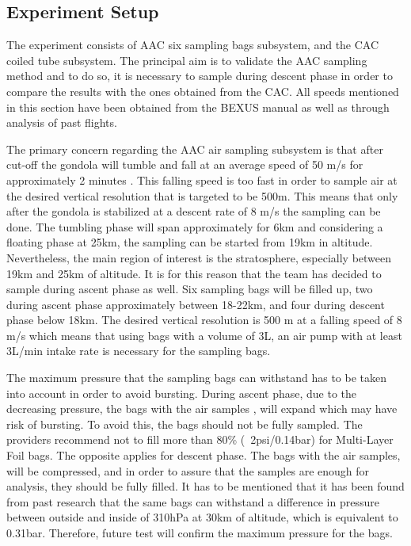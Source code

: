 \subsection{Experiment Setup} \label{Experiment_Setup}

The experiment consists of AAC six sampling bags subsystem, and the CAC coiled tube subsystem. The principal aim is to validate the AAC sampling method and to do so, it is necessary to sample during descent phase in order to compare the results with the ones obtained from the CAC. All speeds mentioned in this section have been obtained from the BEXUS manual as well as through analysis of past flights.

The primary concern regarding the AAC air sampling subsystem is that after cut-off the gondola will tumble and fall at an average speed of 50 m/s for approximately 2 minutes \cite{BexusManual}. This falling speed is too fast in order to sample air at the desired vertical resolution that is targeted to be 500m. This means that only after the gondola is stabilized at a descent rate of 8 m/s \cite{BexusManual} the sampling can be done. The tumbling phase will span approximately for 6km and considering a floating phase at 25km, the sampling can be started from 19km in altitude. Nevertheless, the main region of interest is the stratosphere, especially between 19km and 25km of altitude. It is for this reason that the team has decided to sample during ascent phase as well. Six sampling bags will be filled up, two during ascent phase approximately between 18-22km, and four during descent phase below 18km. The desired vertical resolution is 500 m at a falling speed of 8 m/s which means that using bags with a volume of 3L, an air pump with at least 3L/min intake rate is necessary for the sampling bags.

The maximum pressure that the sampling bags can withstand has to be taken into account in order to avoid bursting. During ascent phase, due to the decreasing pressure, the bags with the air samples , will expand which may have risk of bursting. To avoid this, the bags should not be fully sampled. The providers recommend not to fill more than 80\% (~2psi/0.14bar) for Multi-Layer Foil bags. The opposite applies for descent phase. The bags with the air samples, will be compressed, and in order to assure that the samples are enough for analysis, they should be fully filled. It has to be mentioned that it has been found from past research \cite{LISA} that the same bags can withstand a difference in pressure between outside and inside of 310hPa at 30km of altitude, which is equivalent to 0.31bar. Therefore, future test will confirm the maximum pressure for the bags.

